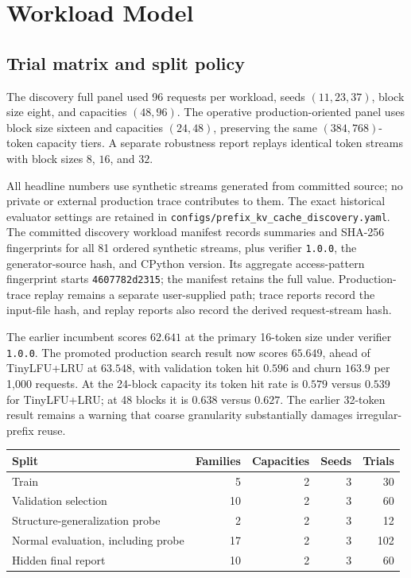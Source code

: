 \documentclass[11pt]{article}
\newcommand{\filepath}[1]{\nolinkurl{#1}}
\newcommand{\identifier}[1]{\nolinkurl{#1}}
\begin{document}
\section{Workload Model}

\subsection{Trial matrix and split policy}

The discovery full panel used 96 requests per workload, seeds \((11,23,37)\), block
size eight, and capacities \((48,96)\).  The operative production-oriented panel uses
block size sixteen and capacities \((24,48)\), preserving the same
\((384,768)\)-token capacity tiers.  A separate robustness report replays identical
token streams with block sizes \(8\), \(16\), and \(32\).

All headline numbers use synthetic streams generated from committed source; no private
or external production trace contributes to them.  The exact historical evaluator
settings are retained in
\filepath{configs/prefix_kv_cache_discovery.yaml}.  The committed discovery workload
manifest records summaries and SHA-256 fingerprints for all 81 ordered synthetic
streams, plus verifier \identifier{1.0.0}, the generator-source hash, and CPython
version.  Its aggregate
access-pattern fingerprint starts \identifier{4607782d2315}; the manifest retains
the full value.
Production-trace replay remains a separate user-supplied path; trace reports record the
input-file hash, and replay reports also record the derived request-stream hash.

The earlier incumbent scores \(62.641\) at the primary 16-token size under verifier
\identifier{1.0.0}.  The promoted
production search result now scores \(65.649\), ahead of TinyLFU+LRU at \(63.548\),
with validation token hit \(0.596\) and churn \(163.9\) per 1,000 requests.  At the
24-block capacity its token hit rate is \(0.579\) versus \(0.539\) for TinyLFU+LRU;
at 48 blocks it is \(0.638\) versus \(0.627\).  The earlier 32-token result remains a
warning that coarse granularity substantially damages irregular-prefix reuse.

\begin{center}
\begin{tabular}{lrrrr}
\toprule
\textbf{Split} & \textbf{Families} & \textbf{Capacities} & \textbf{Seeds} &
\textbf{Trials} \\
\midrule
Train & 5 & 2 & 3 & 30 \\
Validation selection & 10 & 2 & 3 & 60 \\
Structure-generalization probe & 2 & 2 & 3 & 12 \\
Normal evaluation, including probe & 17 & 2 & 3 & 102 \\
Hidden final report & 10 & 2 & 3 & 60 \\
\bottomrule
\end{tabular}
\end{center}
\end{document}
